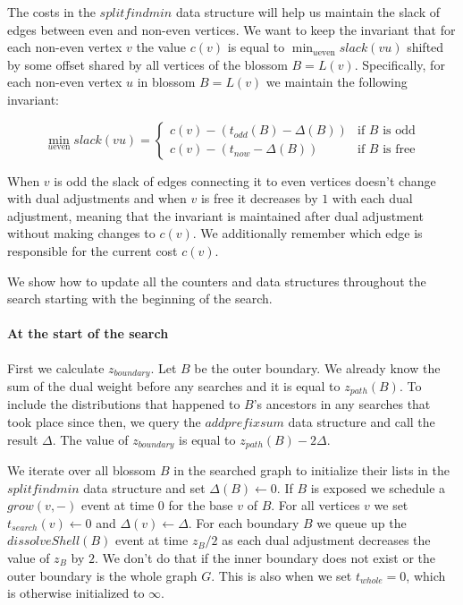The costs in the $splitfindmin$ data structure will help us maintain the slack of edges between even and non-even vertices. We want to keep the invariant that for each non-even vertex $v$ the value $c(v)$ is equal to $\min_{u \text{even}} slack(vu)$ shifted by some offset shared by all vertices of the blossom $B = L(v)$. Specifically, for each non-even vertex $u$ in blossom $B = L(v)$ we maintain the following invariant:

\[ 
\min_{u \text{even}} slack(vu) = \begin{cases}
    c(v) - (t_{odd}(B) - \Delta(B)) & \text{if $B$ is odd} \\
    c(v) - (t_{now} - \Delta(B)) & \text{if $B$ is free}
\end{cases}
\]

When $v$ is odd the slack of edges connecting it to even vertices doesn't change with dual adjustments and when $v$ is free it decreases by $1$ with each dual adjustment, meaning that the invariant is maintained after dual adjustment without making changes to $c(v)$. We additionally remember which edge is responsible for the current cost $c(v)$.

We show how to update all the counters and data structures throughout the search starting with the beginning of the search. 

\paragraph*{At the start of the search} First we calculate $z_{boundary}$. Let $B$ be the outer boundary. We already know the sum of the dual weight before any searches and it is equal to $z_{path}(B)$. To include the distributions that happened to $B$'s ancestors in any searches that took place since then, we query the $addprefixsum$ data structure and call the result $\Delta$. The value of $z_{boundary}$ is equal to $z_{path}(B) - 2\Delta$. 

We iterate over all blossom $B$ in the searched graph to initialize their lists in the $splitfindmin$ data structure and set $\Delta(B) \gets 0$. If $B$ is exposed we schedule a $grow(v, -)$ event at time $0$ for the base $v$ of $B$. For all vertices $v$ we set $t_{search}(v) \gets 0$ and $\Delta(v) \gets \Delta$. For each boundary $B$ we queue up the $dissolveShell(B)$ event at time $z_B / 2$ as each dual adjustment decreases the value of $z_B$ by $2$. We don't do that if the inner boundary does not exist or the outer boundary is the whole graph $G$. This is also when we set $t_{whole} = 0$, which is otherwise initialized to $\infty$.

